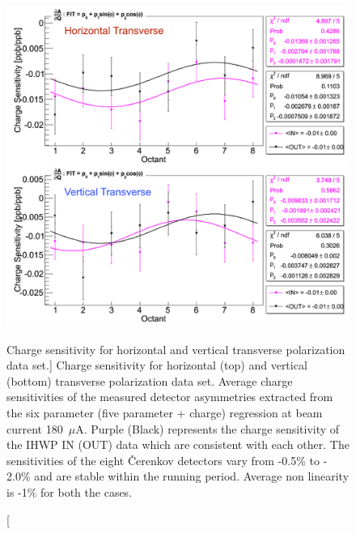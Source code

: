 \begin{figure}[!h]
	\begin{center}
	\includegraphics[width=15.0cm]{figures/transverseN2DeltaChargeSensitivity}
	\end{center}
	\caption
	[Charge sensitivity for horizontal and vertical transverse polarization data set.]
	{Charge sensitivity for horizontal (top) and vertical (bottom) transverse polarization data set. Average charge sensitivities of the measured detector asymmetries extracted from the six parameter (five parameter + charge) regression at beam current 180~$\mu$A. Purple (Black) represents the charge sensitivity of the IHWP IN (OUT) data which are consistent with each other. The sensitivities of the eight \v{C}erenkov detectors vary from -0.5\% to - 2.0\% and are stable within the running period. Average non linearity is -1\% for both the cases.}
	\label{fig:transverseN2DeltaChargeSensitivity}
\end{figure}


